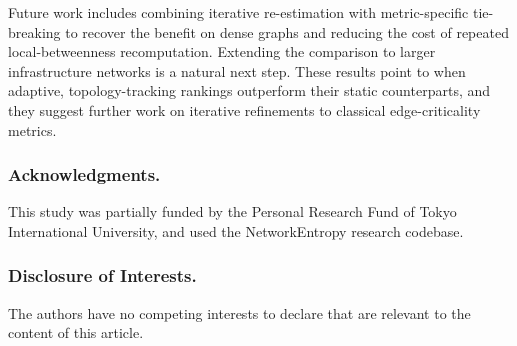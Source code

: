 \documentclass[runningheads,11pt]{article}
\begin{document}
Future work includes combining iterative re-estimation with metric-specific
tie-breaking to recover the benefit on dense graphs and reducing the cost of
repeated local-betweenness recomputation. Extending the comparison to larger
infrastructure networks is a natural next step. These results point to when
adaptive, topology-tracking rankings outperform their static counterparts, and
they suggest further work on iterative refinements to classical edge-criticality
metrics.

\subsubsection*{Acknowledgments.}
This study was partially funded by the Personal Research Fund of Tokyo
International University, and used the NetworkEntropy research codebase.

\subsubsection*{Disclosure of Interests.}
The authors have no competing interests to declare that are relevant to the
content of this article.
\end{document}
